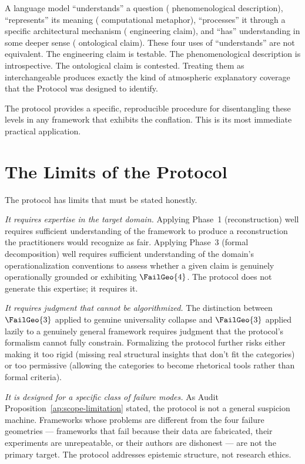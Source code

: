 A language model ``understands'' a question (\LevelIII{}
phenomenological description), ``represents'' its
meaning (\LevelII{} computational metaphor), ``processes''
it through a specific architectural mechanism (\LevelI{}
engineering claim), and ``has'' understanding in some
deeper sense (\LevelIV{} ontological claim). These
four uses of ``understands'' are not equivalent. The
engineering claim is testable. The phenomenological
description is introspective. The ontological claim
is contested. Treating them as interchangeable produces
exactly the kind of atmospheric explanatory coverage
that the \Ortyx{} Protocol was designed to identify.

The protocol provides a specific, reproducible procedure
for disentangling these levels in any framework that
exhibits the conflation. This is its most immediate
practical application.

\section{The Limits of the Protocol}
\label{sec:protocol-limits}

The protocol has limits that must be stated honestly.

\textit{It requires expertise in the target domain.}
Applying Phase~1 (reconstruction) well requires
sufficient understanding of the framework to produce
a reconstruction the practitioners would recognize
as fair. Applying Phase~3 (formal decomposition) well
requires sufficient understanding of the domain's
operationalization conventions to assess whether a
given claim is genuinely operationally grounded or
exhibiting $\FailGeo{4}$. The protocol does not generate
this expertise; it requires it.

\textit{It requires judgment that cannot be algorithmized.}
The distinction between $\FailGeo{3}$ applied to genuine
universality collapse and $\FailGeo{3}$ applied lazily
to a genuinely general framework requires judgment
that the protocol's formalism cannot fully constrain.
Formalizing the protocol further risks either making
it too rigid (missing real structural insights that
don't fit the categories) or too permissive (allowing
the categories to become rhetorical tools rather than
formal criteria).

\textit{It is designed for a specific class of failure
modes.} As Audit Proposition~\ref{ap:scope-limitation}
stated, the protocol is not a general suspicion machine.
Frameworks whose problems are different from the four
failure geometries --- frameworks that fail because
their data are fabricated, their experiments are
unrepeatable, or their authors are dishonest --- are
not the primary target. The protocol addresses epistemic
structure, not research ethics.

